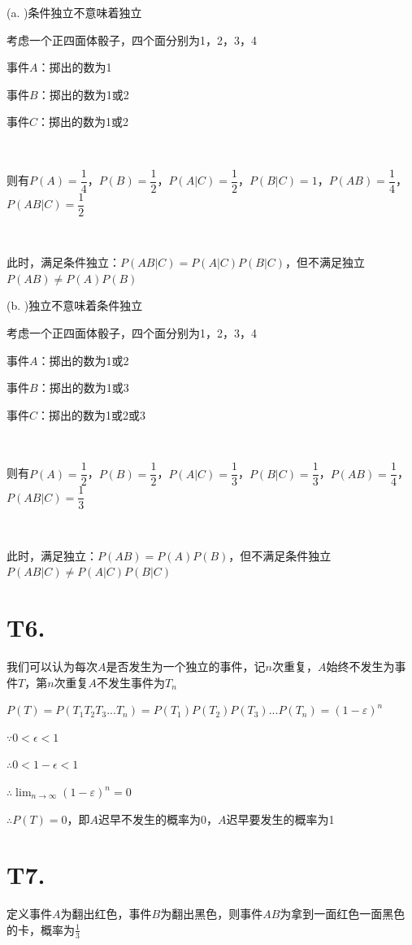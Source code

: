 \documentclass{article}
\begin{document}
(a. )条件独立不意味着独立

考虑一个正四面体骰子，四个面分别为1，2，3，4

事件$A$：掷出的数为1

事件$B$：掷出的数为1或2

事件$C$：掷出的数为1或2

~

则有$P(A)=\dfrac{1}{4}$，$P(B)=\dfrac{1}{2}$，$P(A|C)=\dfrac{1}{2}$，$P(B|C)=1$，$P(AB)=\dfrac{1}{4}$，$P(AB|C)=\dfrac{1}{2}$

~

此时，满足条件独立：$P(AB|C)=P(A|C)P(B|C)$，但不满足独立$P(AB)\neq P(A)P(B)$

(b. )独立不意味着条件独立

考虑一个正四面体骰子，四个面分别为1，2，3，4

事件$A$：掷出的数为1或2

事件$B$：掷出的数为1或3

事件$C$：掷出的数为1或2或3

~

则有$P(A)=\dfrac{1}{2}$，$P(B)=\dfrac{1}{2}$，$P(A|C)=\dfrac{1}{3}$，$P(B|C)=\dfrac{1}{3}$，$P(AB)=\dfrac{1}{4}$，$P(AB|C)=\dfrac{1}{3}$

~

此时，满足独立：$P(AB)=P(A)P(B)$，但不满足条件独立$P(AB|C)\neq P(A|C)P(B|C)$

\section*{T6. }

我们可以认为每次$A$是否发生为一个独立的事件，记$n$次重复，$A$始终不发生为事件$T$，第$n$次重复$A$不发生事件为$T_n$

$P(T)=P(T_1T_2T_3...T_n)=P(T_1)P(T_2)P(T_3)...P(T_n)=(1-\varepsilon)^n$

$\because 0<\epsilon<1$

$\therefore 0<1-\epsilon<1$

$\therefore \lim_{n \to \infty}(1-\varepsilon)^n=0$

$\therefore P(T)=0$，即$A$迟早不发生的概率为0，$A$迟早要发生的概率为1

\section*{T7. }

定义事件$A$为翻出红色，事件$B$为翻出黑色，则事件$AB$为拿到一面红色一面黑色的卡，概率为$\frac{1}{3}$
\end{document}
